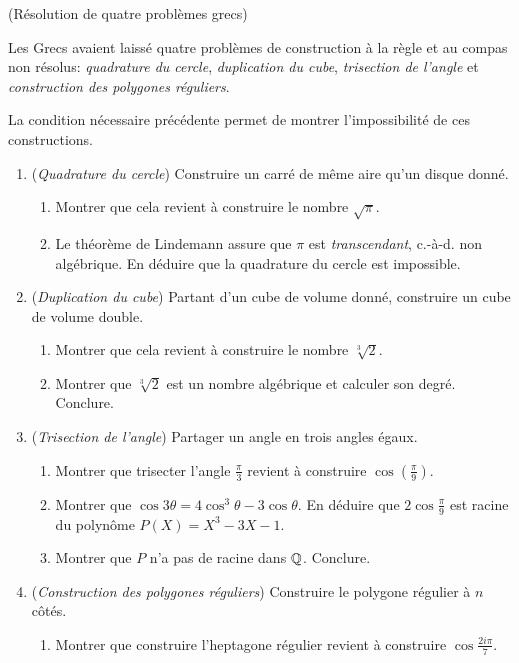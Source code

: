 \documentclass[a4paper,11pt,reqno]{amsart}
\begin{document}
\begin{exo}  (Résolution de quatre problèmes grecs)

  Les Grecs avaient laissé quatre problèmes de construction à la règle et au compas non résolus: \emph{quadrature du cercle}, \emph{duplication du cube}, \emph{trisection de l'angle} et \emph{construction des polygones réguliers}.

  La condition nécessaire précédente permet de montrer l'impossibilité de ces constructions.
  \begin{enumerate}
    \item (\emph{Quadrature du cercle}) Construire un carré de même aire qu'un disque donné.
    \begin{enumerate}
      \item Montrer que cela revient à construire le nombre $\sqrt{\pi}$.
      \item Le théorème de Lindemann assure que $\pi$ est \emph{transcendant}, c.-à-d. non algébrique. En déduire que la quadrature du cercle est impossible.
    \end{enumerate}
    \item (\emph{Duplication du cube}) Partant d'un cube de volume donné, construire un cube de volume double.
    \begin{enumerate}
      \item Montrer que cela revient à construire le nombre $\sqrt[3]{2}$.
      \item Montrer que $\sqrt[3]{2}$ est un nombre algébrique et calculer son degré. Conclure.
    \end{enumerate}
    \item (\emph{Trisection de l'angle})  Partager un angle en trois angles égaux.
    \begin{enumerate}
      \item Montrer que trisecter l'angle $\frac{\pi}{3}$ revient à construire $\cos(\frac{\pi}{9})$.
      \item Montrer que $\cos 3\theta = 4 \cos^3 \theta -3 \cos \theta$. En déduire que $2 \cos \frac{\pi}{9}$ est racine du polynôme $P(X)=X^3-3X-1$.
      \item Montrer que $P$ n'a pas de racine dans $\mathbb{Q}$. Conclure.
    \end{enumerate}
    \item (\emph{Construction des polygones réguliers}) Construire le polygone régulier à $n$ côtés.
    \begin{enumerate}
      \item Montrer que construire l'heptagone régulier revient à construire $\cos\frac{2i\pi}{7}$.

\end{enumerate}
\end{enumerate}
\end{exo}
\end{document}
